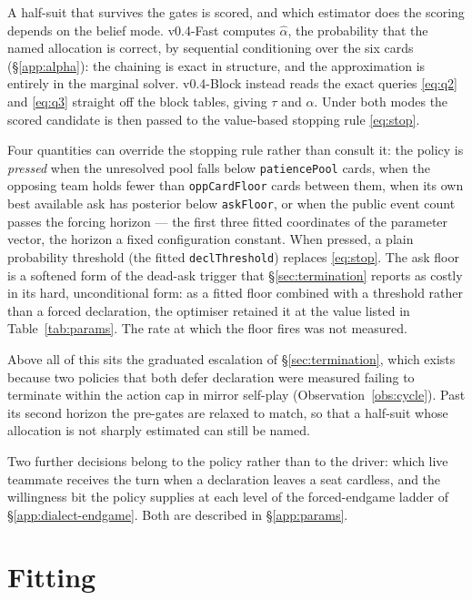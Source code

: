 \documentclass[11pt]{article}
\theoremstyle{definition}
\DeclareRobustCommand{\vfast}{\texorpdfstring{\mbox{v0.4-Fast}}{v0.4-Fast}}
\DeclareRobustCommand{\vblock}{\texorpdfstring{\mbox{v0.4-Block}}{v0.4-Block}}
\begin{document}
A half-suit that survives the gates is scored, and which estimator does the
scoring depends on the belief mode. \vfast{} computes $\hat\alpha$, the
probability that the named allocation is correct, by sequential conditioning
over the six cards (\S\ref{app:alpha}): the chaining is exact in structure,
and the approximation is entirely in the marginal solver. \vblock{} instead
reads the exact queries \eqref{eq:q2} and \eqref{eq:q3} straight off the block
tables, giving $\tau$ and $\alpha$. Under both modes the scored candidate is
then passed to the value-based stopping rule \eqref{eq:stop}.

Four quantities can override the stopping rule rather than consult it: the
policy is \emph{pressed} when the unresolved pool falls below
\texttt{patiencePool} cards, when the opposing team holds fewer than
\texttt{oppCardFloor} cards between them, when its own best available ask has
posterior below \texttt{askFloor}, or when the public event count passes the
forcing horizon --- the first three fitted coordinates of the parameter
vector, the horizon a fixed configuration constant. When pressed, a plain
probability threshold (the fitted \texttt{declThreshold}) replaces
\eqref{eq:stop}. The ask floor is a softened form of the dead-ask trigger that
\S\ref{sec:termination} reports as costly in its hard, unconditional form: as
a fitted floor combined with a threshold rather than a forced declaration, the
optimiser retained it at the value listed in Table~\ref{tab:params}. The rate
at which the floor fires was not measured.

Above all of this sits the graduated escalation of \S\ref{sec:termination},
which exists because two policies that both defer declaration were measured
failing to terminate within the action cap in mirror self-play
(Observation~\ref{obs:cycle}). Past its second horizon the pre-gates are
relaxed to match, so that a half-suit whose allocation is not sharply
estimated can still be named.

Two further decisions belong to the policy rather than to the driver: which
live teammate receives the turn when a declaration leaves a seat cardless, and
the willingness bit the policy supplies at each level of the forced-endgame
ladder of \S\ref{app:dialect-endgame}. Both are described in
\S\ref{app:params}.
\section{Fitting}
\label{sec:fitting}
\end{document}
